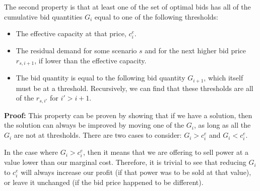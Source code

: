 \documentclass[12pt]{article}
\begin{document}
The second property is that at least one of the set of optimal bids has
all of the cumulative bid quantities $G_i$ equal to one of the following
thresholds:
\begin{itemize}
\item The effective capacity at that price, $c^e_i$.
\item The residual demand for some scenario $s$ and for the next higher
bid price $r_{s,i+1}$, if lower than the effective capacity.
\item The bid quantity is equal to the following bid quantity $G_{i+1}$,
which itself must be at a threshold. Recursively, we can find that these
thresholds are all of the $r_{s,i'}$ for $i' > i+1$.
\end{itemize}

\textbf{Proof:} This property can be proven by showing that if we have
a solution, then the solution can always be improved by moving one of
the $G_i$, as long as all the $G_i$ are not at thresholds.
There are two cases to consider: $G_i > c^e_i$ and $G_i < c^e_i$.

In the case where $G_i > c^e_i$, then it means that we are offering to
sell power at a value lower than our marginal cost. Therefore, it is
trivial to see that reducing $G_i$ to $c^e_i$ will always increase
our profit (if that power was to be sold at that value), or leave it
unchanged (if the bid price happened to be different).
\end{document}
